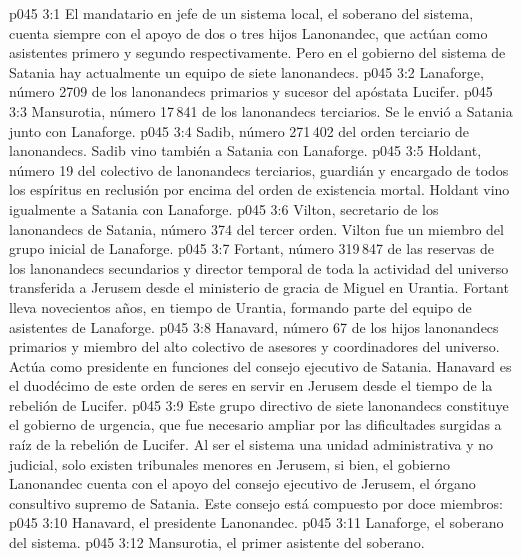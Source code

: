 \vs p045 3:1 El mandatario en jefe de un sistema local, el soberano del sistema, cuenta siempre con el apoyo de dos o tres hijos Lanonandec, que actúan como asistentes primero y segundo respectivamente. Pero en el gobierno del sistema de Satania hay actualmente un equipo de siete lanonandecs.
\vs p045 3:2  Lanaforge, número 2709 de los lanonandecs primarios y sucesor del apóstata Lucifer.
\vs p045 3:3  Mansurotia, número 17\,841 de los lanonandecs terciarios. Se le envió a Satania junto con Lanaforge.
\vs p045 3:4  Sadib, número 271\,402 del orden terciario de lanonandecs. Sadib vino también a Satania con Lanaforge.
\vs p045 3:5  Holdant, número 19 del colectivo de lanonandecs terciarios, guardián y encargado de todos los espíritus en reclusión por encima del orden de existencia mortal. Holdant vino igualmente a Satania con Lanaforge.
\vs p045 3:6  Vilton, secretario de los lanonandecs de Satania, número 374 del tercer orden. Vilton fue un miembro del grupo inicial de Lanaforge.
\vs p045 3:7  Fortant, número 319\,847 de las reservas de los lanonandecs secundarios y director temporal de toda la actividad del universo transferida a Jerusem desde el ministerio de gracia de Miguel en Urantia. Fortant lleva novecientos años, en tiempo de Urantia, formando parte del equipo de asistentes de Lanaforge.
\vs p045 3:8  Hanavard, número 67 de los hijos lanonandecs primarios y miembro del alto colectivo de asesores y coordinadores del universo. Actúa como presidente en funciones del consejo ejecutivo de Satania. Hanavard es el duodécimo de este orden de seres en servir en Jerusem desde el tiempo de la rebelión de Lucifer.
\vs p045 3:9 \pc Este grupo directivo de siete lanonandecs constituye el gobierno de urgencia, que fue necesario ampliar por las dificultades surgidas a raíz de la rebelión de Lucifer. Al ser el sistema una unidad administrativa y no judicial, solo existen tribunales menores en Jerusem, si bien, el gobierno Lanonandec cuenta con el apoyo del consejo ejecutivo de Jerusem, el órgano consultivo supremo de Satania. Este consejo está compuesto por doce miembros:
\vs p045 3:10 Hanavard, el presidente Lanonandec.
\vs p045 3:11 Lanaforge, el soberano del sistema.
\vs p045 3:12 Mansurotia, el primer asistente del soberano.
